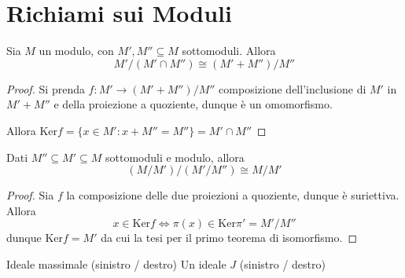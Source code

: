 \section{Richiami sui Moduli}
\begin{theorem}
    Sia \(M\) un modulo, con \(M', M'' \subseteq M \) sottomoduli. Allora 
    \[
      M' / (M' \cap  M'') \cong {(M' + M'')} / M''
    \]
\end{theorem}
\begin{proof}{}
    Si prenda \(f : M' \to (M' + M'') / M''\) composizione dell'inclusione di \(M'\) in \(M' + M''\) e della proiezione a quoziente, dunque è un omomorfismo.

    Allora \(\mathrm{Ker} f = \{x \in M' : x + M'' = M''\} = M' \cap  M'' \) 
\end{proof}


\begin{theorem}
    Dati \(M'' \subseteq M' \subseteq M\)  sottomoduli e modulo, allora
    \[
      {({M}/{M'})} / {(M'/ M'')} \cong M / M'
    \]
\end{theorem}
\begin{proof}{}
    Sia \(f\) la composizione delle due proiezioni a quoziente, dunque è
    suriettiva. Allora
    \[
      x \in \mathrm{Ker}f \iff \pi{(x)} \in \mathrm{Ker}\pi' = M'/M''
    \]
    dunque \(\mathrm{Ker}f  = M'\) da cui la tesi per il primo teorema di
    isomorfismo.
\end{proof}
%
\begin{definition}{Ideale massimale (sinistro / destro)}
    Un ideale \(J\) (sinistro / destro)
\end{definition}


